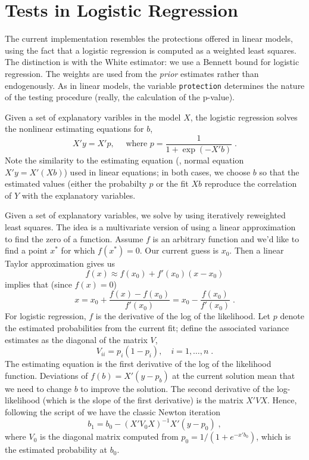 \documentclass[12pt]{article}
\begin{document}
\section{Tests in Logistic Regression} %

 The current implementation resembles the protections offered in linear models,
 using the fact that a logistic regression is computed as a weighted least
 squares.  The distinction is with the White estimator: we use a Bennett bound
 for logistic regression.  The weights are used from the {\em prior} estimates
 rather than endogenously.  As in linear models, the variable {\tt protection}
 determines the nature of the testing procedure (really, the calculation of the
 p-value).  

 Given a set of explanatory varibles in the model $X$, the logistic regression
 solves the nonlinear estimating equations for $b$,
\begin{equation}
  X'y = X'p, \quad \mbox{ where } p = \frac{1}{1+\exp(-X'b)} \;.
\label{eq:esteq}
\end{equation}
 Note the similarity to the estimating equation (\aka, normal equation $X'y =
 X'(Xb)$) used in linear equations; in both cases, we choose $b$ so that the
 estimated values (either the probabilty $p$ or the fit $Xb$ reproduce the
 correlation of $Y$ with the explanatory variables.  

 Given a set of explanatory variables, we solve  by using
 iteratively reweighted least squares.  The idea is a multivariate version of
 using a linear approximation to find the zero of a function.  Assume $f$ is an
 arbitrary function and we'd like to find a point $x^{*}$ for which $f(x^{*}) =
 0$.  Our current guess is $x_0$. Then a linear Taylor approximation gives us
\begin{displaymath}
  f(x) \approx f(x_0) + f'(x_0)(x-x_0)
\end{displaymath}
 implies that (since $f(x) = 0$)
\begin{equation}
  x = x_0 + \frac{f(x)-f(x_0)}{f'(x_0)} = x_0-\frac{f(x_0)}{f'(x_0)} \;.
\label{eq:newton}
\end{equation}
 For logistic regression, $f$ is the derivative of the log of the likelihood.
  Let $p$ denote the estimated probabilities from the current fit; define the
 associated variance estimates as the diagonal of the matrix $V$,
\begin{displaymath}
  V_{ii} = p_i (1-p_i), \quad i=1,\ldots, n\;.
\end{displaymath}
 The estimating equation  is the first derivative of the log of
 the likelihood function.  Deviations of $f(b) = X'(y-p_b)$ at the current
 solution mean that we need to change $b$ to improve the solution. The second
 derivative of the log-likelihood (which is the slope of the first derivative)
 is the matrix $X'VX$.  Hence, following the script of  we have
 the classic Newton iteration
\begin{equation}
  b_1 = b_0 - (X'V_0X)^{-1}X'(y-p_0) \;,
\label{eq:newton}
\end{equation}
 where $V_0$ is the diagonal matrix computed from $p_0 = 1/(1+e^{-x'b_0})$,
 which is the estimated probability at $b_0$.
\end{document}
